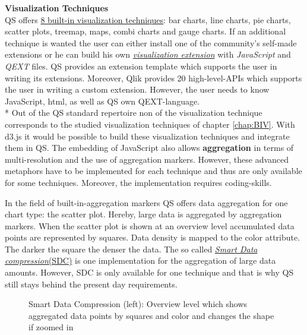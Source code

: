 \textbf{Visualization Techniques}\\
QS offers \href{https://help.qlik.com/en-US/sense/2.1/Subsystems/Hub/Content/Visualizations/visualizations.htm}{8 built-in visualization techniques}: bar charts, line charts, pie charts, scatter plots, treemap, maps, combi charts and gauge charts. If an additional technique is wanted the user can either install one of the community's self-made extensions or he can build his own \href{https://help.qlik.com/en-US/sense-developer/3.2/Subsystems/Extensions/Content/extensions-getting-started.htm}{\textit{visualization extension}} with \textit{JavaScript} and \textit{QEXT} files\cite{qlikWorkbench}. QS provides an extension template which supports the user in writing its extensions. Moreover, Qlik provides 20 high-level-APIs which supports the user in writing a custom extension. However, the user needs to know JavaScript, html\cite{qlikVisExtensions}, as well as QS own QEXT-language. \\*
Out of the QS standard repertoire non of the visualization technique corresponds to the studied visualization techniques of chapter \ref{chap:BIV}. With d3.js it would be possible to build these visualization techniques and integrate them in QS. 
The embedding of JavaScript also allows \textbf{aggregation} in terms of multi-resolution and the use of aggregation markers. However, these advanced metaphors have to be implemented for each technique and thus are only available for some techniques. Moreover, the implementation requires coding-skills. 

In the field of built-in-aggregation markers QS offers data aggregation for one chart type: the scatter plot. Hereby, large data is aggregated by aggregation markers. When the scatter plot is shown at an overview level accumulated data points are represented by squares. Data density is mapped to the color attribute.  The darker the square the denser the data\cite{qlikScatter}. The so called \href{https://help.qlik.com/en-US/sense/2.1/Subsystems/Hub/Content/Visualizations/scatter plot/scatter-plot.htm}{\textit{Smart Data compression}(SDC)} is one implementation for the aggregation of large data amounts. However, SDC is only available for one technique and that is why QS still stays behind the present day requirements.


\begin{figure}[H]
    \centering
    \caption{Smart Data Compression (left): Overview level which shows aggregated data points by squares and color and changes the shape if zoomed in}
    \label{fig:smartdatacompression}
\end{figure}

